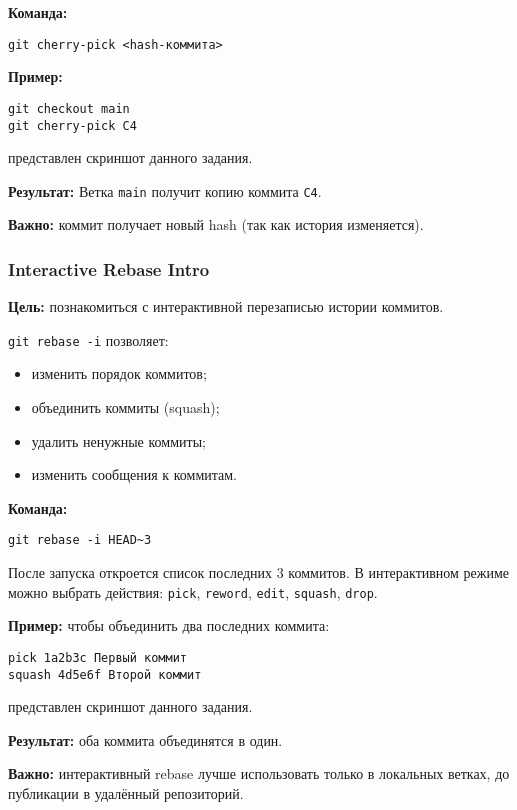 \documentclass[a4paper,12pt]{report}
\begin{document}
\textbf{Команда:}
\begin{verbatim}
git cherry-pick <hash-коммита>
\end{verbatim}

\textbf{Пример:}
\begin{verbatim}
git checkout main
git cherry-pick C4
\end{verbatim}

 представлен скриншот данного задания.

\textbf{Результат:} Ветка \texttt{main} получит копию коммита \texttt{C4}.

\textbf{Важно:} коммит получает новый hash (так как история изменяется).

\subsubsection{Interactive Rebase Intro}
\textbf{Цель:} познакомиться с интерактивной перезаписью истории коммитов.

\texttt{git rebase -i} позволяет:
\begin{itemize}[noitemsep]
    \item изменить порядок коммитов;
    \item объединить коммиты (squash);
    \item удалить ненужные коммиты;
    \item изменить сообщения к коммитам.
\end{itemize}

\textbf{Команда:}
\begin{verbatim}
git rebase -i HEAD~3
\end{verbatim}

После запуска откроется список последних 3 коммитов. В интерактивном режиме можно выбрать действия: \texttt{pick}, \texttt{reword}, \texttt{edit}, \texttt{squash}, \texttt{drop}.

\textbf{Пример:} чтобы объединить два последних коммита:
\begin{verbatim}
pick 1a2b3c Первый коммит
squash 4d5e6f Второй коммит
\end{verbatim}

 представлен скриншот данного задания.

\textbf{Результат:} оба коммита объединятся в один.

\textbf{Важно:} интерактивный rebase лучше использовать только в локальных ветках, до публикации в удалённый репозиторий.
\end{document}
